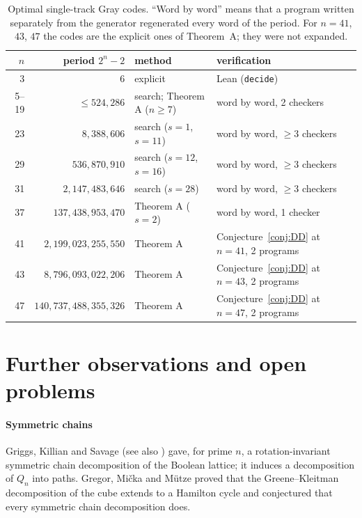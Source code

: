 \documentclass[journal,onecolumn,11pt]{IEEEtran}
\begin{document}
\begin{table}[h]
\centering
\begin{tabular}{rrll}
\toprule
$n$ & period $2^n-2$ & method & verification\\
\midrule
3 & $6$ & explicit & Lean (\texttt{decide})\\
5--19 & $\le 524{,}286$ & search; Theorem A ($n\ge7$) & word by word, 2 checkers\\
23 & $8{,}388{,}606$ & search ($s=1$, $s=11$) & word by word, $\ge3$ checkers\\
29 & $536{,}870{,}910$ & search ($s=12$, $s=16$) & word by word, $\ge3$ checkers\\
31 & $2{,}147{,}483{,}646$ & search ($s=28$) & word by word, $\ge3$ checkers\\
37 & $137{,}438{,}953{,}470$ & Theorem A ($s=2$) & word by word, 1 checker\\
41 & $2{,}199{,}023{,}255{,}550$ & Theorem A & Conjecture~\ref{conj:DD} at $n=41$, 2 programs\\
43 & $8{,}796{,}093{,}022{,}206$ & Theorem A & Conjecture~\ref{conj:DD} at $n=43$, 2 programs\\
47 & $140{,}737{,}488{,}355{,}326$ & Theorem A & Conjecture~\ref{conj:DD} at $n=47$, 2 programs\\
\bottomrule
\end{tabular}
\caption{Optimal single-track Gray codes. ``Word by word'' means that a program written separately from the generator
regenerated every word of the period. For $n=41$, $43$, $47$ the codes are the explicit ones of Theorem~A; they were
not expanded.}
\end{table}

\section{Further observations and open problems}\label{sec:open}

\paragraph{Symmetric chains} Griggs, Killian and Savage \cite{GKS04} (see also \cite{KRSW04}) gave, for prime $n$, a
rotation-invariant symmetric chain decomposition of the Boolean lattice; it induces a decomposition of $Q_n$ into
paths. Gregor, Mi\v{c}ka and M\"utze \cite{GMM} proved that the Greene--Kleitman decomposition of the cube extends to a
Hamilton cycle and conjectured that every symmetric chain decomposition does.
\end{document}
